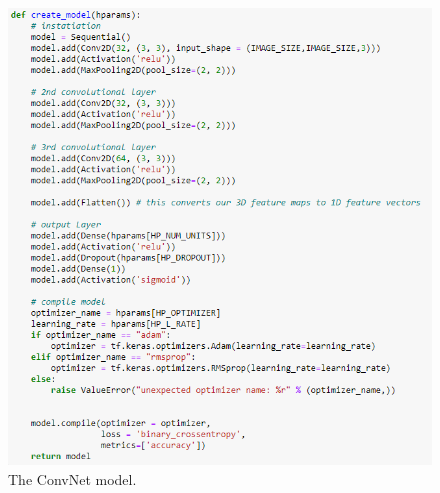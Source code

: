 \begin{figure}[H]
    \centering
    \includegraphics[width=\textwidth]{figures/convnet-model.png}
    \caption{The ConvNet model.}
    \label{fig:convnet-model}
\end{figure}

